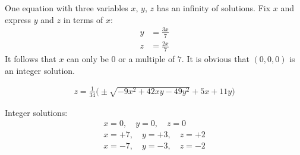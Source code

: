 One equation with three variables $x$, $y$, $z$ has an infinity of solutions. Fix $x$ and express $y$ and $z$ in terms of $x$:
\begin{align*}
y & = \frac{3x}{7} 
\\
z & = \frac{2x}{7} 
\end{align*}
It follows that $x$ can only be $0$ or a multiple of $7$. It is obvious that $(0,0,0)$ is an integer solution. 

\begin{align*}
z = \frac{1}{34}  \bigl( \pm \sqrt{-9x^{2} + 42xy - 49y^{2}} + 5x + 11y \bigr)
\end{align*}


Integer solutions:
\begin{align*}
x = 0, 
\quad
y = 0,
\quad 
z = 0
\\
x = +7, 
\quad
y = +3,
\quad 
z = +2
\\
x = -7, 
\quad
y = -3,
\quad 
z = -2
\end{align*}

